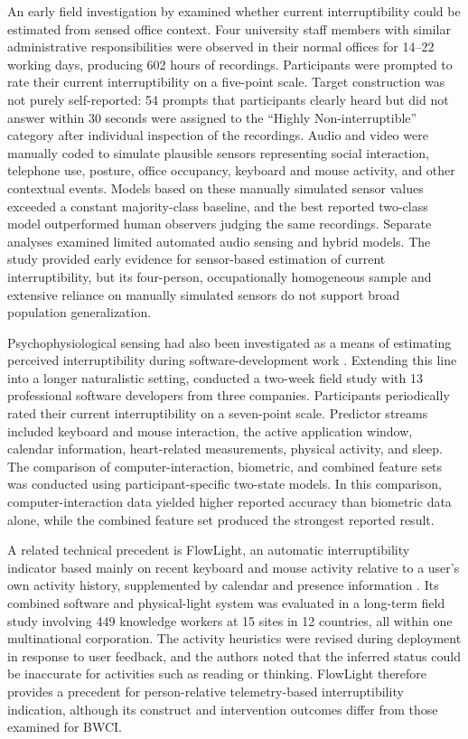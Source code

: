 An early field investigation by \textcite{fogarty2005interruptibility} examined whether current interruptibility could be estimated from sensed office context. Four university staff members with similar administrative responsibilities were observed in their normal offices for 14--22 working days, producing 602 hours of recordings. Participants were prompted to rate their current interruptibility on a five-point scale. Target construction was not purely self-reported: 54 prompts that participants clearly heard but did not answer within 30 seconds were assigned to the ``Highly Non-interruptible'' category after individual inspection of the recordings. Audio and video were manually coded to simulate plausible sensors representing social interaction, telephone use, posture, office occupancy, keyboard and mouse activity, and other contextual events. Models based on these manually simulated sensor values exceeded a constant majority-class baseline, and the best reported two-class model outperformed human observers judging the same recordings. Separate analyses examined limited automated audio sensing and hybrid models. The study provided early evidence for sensor-based estimation of current interruptibility, but its four-person, occupationally homogeneous sample and extensive reliance on manually simulated sensors do not support broad population generalization. 

Psychophysiological sensing had also been investigated as a means of estimating perceived interruptibility during software-development work \parencite{zueger2015interruptibility}. Extending this line into a longer naturalistic setting, \textcite{zueger2018sensing} conducted a two-week field study with 13 professional software developers from three companies. Participants periodically rated their current interruptibility on a seven-point scale. Predictor streams included keyboard and mouse interaction, the active application window, calendar information, heart-related measurements, physical activity, and sleep. The comparison of computer-interaction, biometric, and combined feature sets was conducted using participant-specific two-state models. In this comparison, computer-interaction data yielded higher reported accuracy than biometric data alone, while the combined feature set produced the strongest reported result.

A related technical precedent is FlowLight, an automatic interruptibility indicator based mainly on recent keyboard and mouse activity relative to a user's own activity history, supplemented by calendar and presence information \parencite{zueger2017flowlight}. Its combined software and physical-light system was evaluated in a long-term field study involving 449 knowledge workers at 15 sites in 12 countries, all within one multinational corporation. The activity heuristics were revised during deployment in response to user feedback, and the authors noted that the inferred status could be inaccurate for activities such as reading or thinking. FlowLight therefore provides a precedent for person-relative telemetry-based interruptibility indication, although its construct and intervention outcomes differ from those examined for BWCI.

